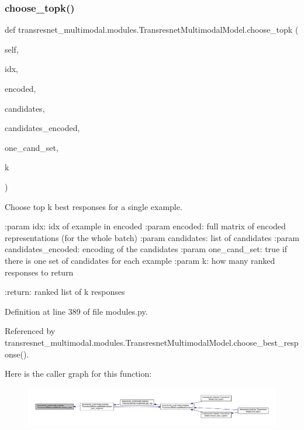 \subsubsection{\texorpdfstring{choose\+\_\+topk()}{choose\_topk()}}
{\footnotesize\ttfamily def transresnet\+\_\+multimodal.\+modules.\+Transresnet\+Multimodal\+Model.\+choose\+\_\+topk (\begin{DoxyParamCaption}\item[{}]{self,  }\item[{}]{idx,  }\item[{}]{encoded,  }\item[{}]{candidates,  }\item[{}]{candidates\+\_\+encoded,  }\item[{}]{one\+\_\+cand\+\_\+set,  }\item[{}]{k }\end{DoxyParamCaption})}

\begin{DoxyVerb}Choose top k best responses for a single example.

:param idx:
    idx of example in encoded
:param encoded:
    full matrix of encoded representations (for the whole batch)
:param candidates:
    list of candidates
:param candidates_encoded:
    encoding of the candidates
:param one_cand_set:
    true if there is one set of candidates for each example
:param k:
    how many ranked responses to return

:return:
    ranked list of k responses
\end{DoxyVerb}
 

Definition at line 389 of file modules.\+py.



Referenced by transresnet\+\_\+multimodal.\+modules.\+Transresnet\+Multimodal\+Model.\+choose\+\_\+best\+\_\+response().

Here is the caller graph for this function\+:
\nopagebreak
\begin{figure}[H]
\begin{center}
\leavevmode
\includegraphics[width=350pt]{classtransresnet__multimodal_1_1modules_1_1TransresnetMultimodalModel_a8d2154a0d338144c48e049ebe76b9727_icgraph}
\end{center}
\end{figure}
\mbox{\label{classtransresnet__multimodal_1_1modules_1_1TransresnetMultimodalModel_af21e163c4c9d044d575d3bdb02410d9e}} 
